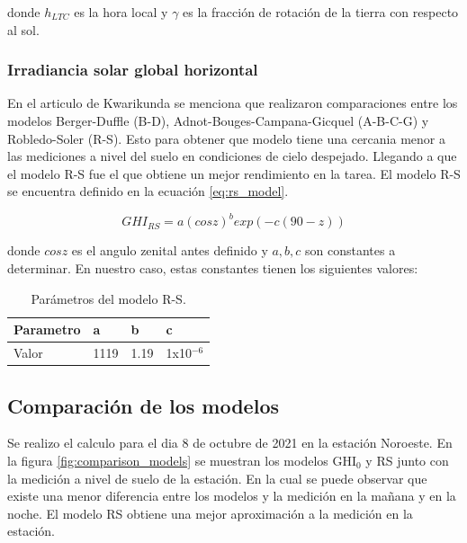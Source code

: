 donde $h_{LTC}$ es la hora local y $\gamma$ es la fracción de rotación de la tierra con respecto al sol.

\subsubsection{Irradiancia solar global horizontal}

En el articulo de Kwarikunda\cite{Kwarikunda_2021} se menciona que realizaron comparaciones entre los modelos Berger-Duffle (B-D), Adnot-Bouges-Campana-Gicquel (A-B-C-G) y Robledo-Soler (R-S). Esto para obtener que modelo tiene una cercania menor a las mediciones a nivel del suelo en condiciones de cielo despejado. Llegando a que el modelo R-S fue el que obtiene un mejor rendimiento en la tarea. El modelo R-S se encuentra definido en la ecuación \ref{eq:rs_model}.

\begin{equation}
  GHI_{RS} = a(cos z)^b exp(-c(90-z))
  \label{eq:rs_model}
\end{equation}

donde $cos z$ es el angulo zenital antes definido y $a,b,c$ son constantes a determinar. En nuestro caso, estas constantes tienen los siguientes valores:

\begin{table}
  \centering
  \begin{tabular}{llll} \hline
    \textbf{Parametro }& \textbf{a} & \textbf{b} & \textbf{c} \\ \hline
    Valor     & 1119& 1.19 & 1x10$^{-6  }$\\ \hline
  \end{tabular}
  \label{table:rs_parameters}
  \caption{Parámetros del modelo R-S.}
\end{table}

\subsection{Comparación de los modelos}

Se realizo el calculo para el dia 8 de octubre de 2021 en la estación Noroeste. En la figura \ref{fig:comparison_models} se muestran los modelos GHI$_0$ y RS junto con la medición a nivel de suelo de la estación. En la cual se puede observar que existe una menor diferencia entre los modelos y la medición en la mañana y en la noche. El modelo RS obtiene una mejor aproximación a la medición en la estación.

